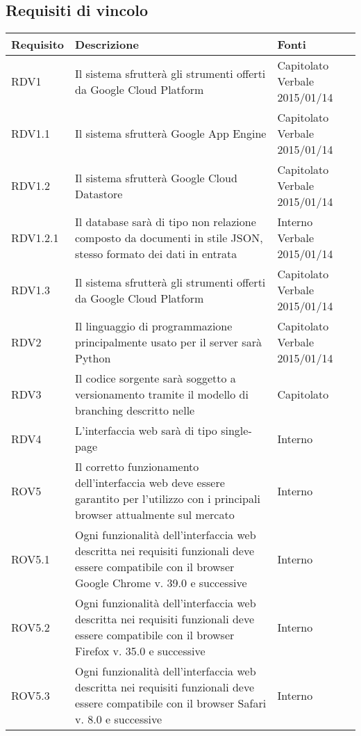 \subsection{Requisiti di vincolo}

\begin{center}

	\def\arraystretch{1.5}
	\bgroup
	\begin{longtable}{| p{2.5cm} | p{8cm} | p{2cm} |}

		\hline
		\textbf{Requisito} & \textbf{Descrizione} & \textbf{Fonti} \\
		\hline

		RDV1  &  Il sistema sfrutterà gli strumenti offerti da Google Cloud Platform  &  Capitolato \newline Verbale 2015/01/14 \\
		\hline
		RDV1.1  &  Il sistema sfrutterà Google App Engine  &  Capitolato \newline Verbale 2015/01/14 \\
		\hline
		RDV1.2  &  Il sistema sfrutterà Google Cloud Datastore  &  Capitolato \newline Verbale 2015/01/14 \\
		\hline
		RDV1.2.1  &  Il database sarà di tipo non relazione composto da documenti in stile JSON, stesso formato dei dati in entrata  &  Interno \newline Verbale 2015/01/14 \\
		\hline
		RDV1.3  &  Il sistema sfrutterà gli strumenti offerti da Google Cloud Platform  &  Capitolato \newline Verbale 2015/01/14 \\
		\hline
		RDV2  &  Il linguaggio di programmazione principalmente usato per il server sarà Python  &  Capitolato \newline Verbale 2015/01/14 \\
		\hline
		RDV3  &  Il codice sorgente sarà soggetto a versionamento tramite il modello di branching descritto nelle \docNameVersionNdP  &  Capitolato \\
		\hline
		RDV4  &  L'interfaccia web sarà di tipo single-page  &  Interno \\
		\hline
		ROV5  &  Il corretto funzionamento dell'interfaccia web deve essere garantito per l'utilizzo con i principali browser attualmente sul mercato   &  Interno \\
		\hline
		ROV5.1  &  Ogni funzionalità dell'interfaccia web descritta nei requisiti funzionali deve essere compatibile con il browser Google Chrome v. 39.0 e successive   &  Interno \\
		\hline
		ROV5.2  &  Ogni funzionalità dell'interfaccia web descritta nei requisiti funzionali deve essere compatibile con il browser Firefox v. 35.0 e successive   &  Interno \\
		\hline
		ROV5.3  &  Ogni funzionalità dell'interfaccia web descritta nei requisiti funzionali deve essere compatibile con il browser Safari v. 8.0 e successive   &  Interno \\
		\hline


\end{longtable}
\end{center}
